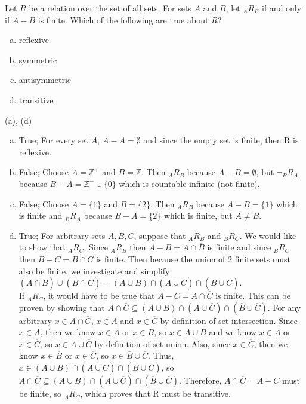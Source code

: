 Let $R$ be a relation over the set of all sets. For sets $A$ and $B$, let ${}_A R_B$ if and only if $A - B$ is finite. Which of the following are true about $R$?
\begin{enumerate}[a)]
    \item reflexive
    \item symmetric
    \item antisymmetric
    \item transitive
\end{enumerate}
\begin{solution}
(a), (d)\\
\begin{enumerate}[a)]
    \item True; For every set $A$, $A - A = \emptyset$ and since the empty set is finite, then R is reflexive.
    \item False; Choose $A = \mathbb{Z^+}$ and $B = \mathbb{Z}$. Then ${}_A R_B$ because $A - B = \emptyset$, but $\neg {}_B R_A$ because $B - A = \mathbb{Z^-} \cup \{0\}$ which is countable infinite (not finite).
    \item False; Choose $A = \{1\}$ and $B = \{2\}$. Then ${}_A R_B$ because $A - B = \{1\}$ which is finite and ${}_B R_A$ because $B - A = \{2\}$ which is finite, but $A \neq B$.
    \item True; For arbitrary sets $A, B, C$, suppose that ${}_A R_B$ and ${}_B R_C$. We would like to show that ${}_A R_C$. Since ${}_A R_B$ then $A - B = A \cap \overline{B}$ is finite and since ${}_B R_C$ then $B - C = B \cap \overline{C}$ is finite. Then because the union of 2 finite sets must also be finite, we investigate and simplify $(A \cap \overline{B}) \cup (B \cap \overline{C}) = (A \cup B) \cap (A \cup \overline{C}) \cap (\overline{B} \cup \overline{C})$.\\
    If ${}_A R_C$, it would have to be true that $A - C = A \cap \overline{C}$ is finite. This can be proven by showing that $A \cap \overline{C} \subseteq (A \cup B) \cap (A \cup \overline{C}) \cap (\overline{B} \cup \overline{C})$. For any arbitrary $x \in A \cap \overline{C}$, $x \in A$ and $x \in \overline{C}$ by definition of set intersection. Since $x \in A$, then we know $x \in A$ or $x \in B$, so $x \in A \cup B$ and we know $x \in A$ or $x \in \overline{C}$, so $x \in A \cup \overline{C}$ by definition of set union. Also, since $x \in \overline{C}$, then we know $x \in \overline{B}$ or $x \in \overline{C}$, so $x \in \overline{B} \cup \overline{C}$. Thus, $x \in (A \cup B) \cap (A \cup \overline{C}) \cap (\overline{B} \cup \overline{C})$, so $A \cap \overline{C} \subseteq (A \cup B) \cap (A \cup \overline{C}) \cap (\overline{B} \cup \overline{C})$. Therefore, $A \cap \overline{C} = A - C$ must be finite, so ${}_A R_C$, which proves that R must be transitive.
\end{enumerate}
\end{solution}

